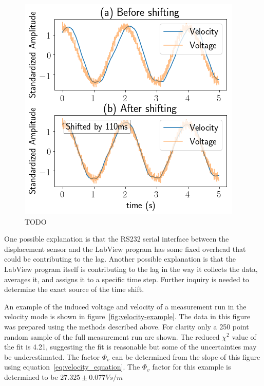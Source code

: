 \documentclass[aps,prstab,reprint,12pt]{revtex4-1}
\begin{document}
\begin{figure}[t]
    \centering
    \includegraphics[width=\linewidth]{figs/data/autocorrelation.png}
    \caption{TODO}
    \label{fig:correlation}
\end{figure}

One possible explanation is that the RS232 serial interface between the displacement sensor and the LabView program has some fixed overhead that could be contributing to the lag.
Another possible explanation is that the LabView program itself is contributing to the lag in the way it collects the data, averages it, and assigns it to a specific time step.
Further inquiry is needed to determine the exact source of the time shift.

An example of the induced voltage and velocity of a measurement run in the velocity mode is shown in figure~\ref{fig:velocity-example}. The data in this figure was prepared using the methods described above. For clarity only a 250 point random sample of the full measurement run are shown. The reduced $\chi^2$ value of the fit is 4.21, suggesting the fit is reasonable but some of the uncertainties may be underestimated. The factor $\Phi_v$ can be determined from the slope of this figure using equation~\ref{eq:velocity_equation}. The $\Phi_v$ factor for this example is determined to be $27.325 \pm 0.077\si{Vs/m}$
\end{document}
